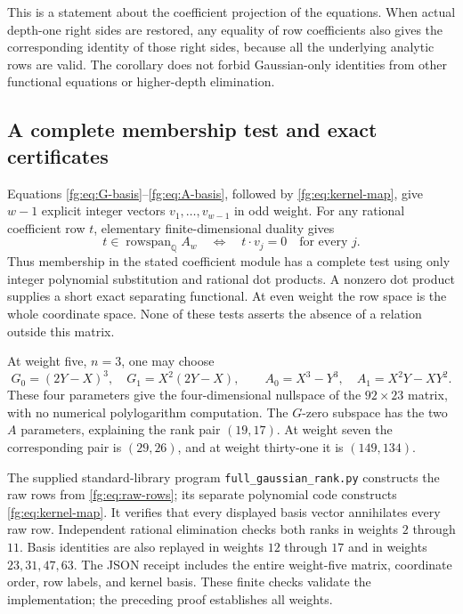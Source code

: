 \documentclass[11pt,a4paper]{article}
\theoremstyle{definition}
\theoremstyle{remark}
\numberwithin{equation}{section}
\begin{document}
This is a statement about the coefficient projection of the equations.
When actual depth-one right sides are restored, any equality of row
coefficients also gives the corresponding identity of those right
sides, because all the underlying analytic rows are valid. The
corollary does not forbid Gaussian-only identities from other
functional equations or higher-depth elimination.

\subsection{A complete membership test and exact certificates}

Equations \eqref{fg:eq:G-basis}--\eqref{fg:eq:A-basis}, followed by
\eqref{fg:eq:kernel-map}, give $w-1$ explicit integer vectors
$v_1,\ldots,v_{w-1}$ in odd weight. For any rational coefficient row
$t$, elementary finite-dimensional duality gives
\begin{equation}\label{fg:eq:membership}
 t\in\operatorname{rowspan}_{\mathbb Q}A_w
 \quad\Longleftrightarrow\quad
 t\cdot v_j=0\quad\text{for every }j.
\end{equation}
Thus membership in the stated coefficient module has a complete test
using only integer polynomial substitution and rational dot products.
A nonzero dot product supplies a short exact separating functional.
At even weight the row space is the whole coordinate space. None of
these tests asserts the absence of a relation outside this matrix.

At weight five, $n=3$, one may choose
\[
 G_0=(2Y-X)^3,\quad G_1=X^2(2Y-X),\qquad
 A_0=X^3-Y^3,\quad A_1=X^2Y-XY^2.
\]
These four parameters give the four-dimensional nullspace of the
$92\times23$ matrix, with no numerical polylogarithm computation.
The $G$-zero subspace has the two $A$ parameters, explaining the
rank pair $(19,17)$. At weight seven the corresponding pair is
$(29,26)$, and at weight thirty-one it is $(149,134)$.

The supplied standard-library program
\texttt{full\_gaussian\_rank.py} constructs the raw rows from
\eqref{fg:eq:raw-rows}; its separate polynomial code constructs
\eqref{fg:eq:kernel-map}. It verifies that every displayed basis
vector annihilates every raw row. Independent rational elimination
checks both ranks in weights $2$ through $11$. Basis identities are
also replayed in weights $12$ through $17$ and in weights
$23,31,47,63$. The JSON receipt includes the entire weight-five
matrix, coordinate order, row labels, and kernel basis. These finite
checks validate the implementation; the preceding proof establishes
all weights.
\end{document}
